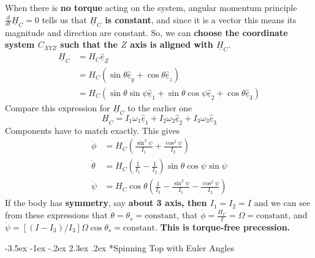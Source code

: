 \documentclass[letterpaper,twocolumn,notitlepage]{article}
\makeatletter
\renewcommand\subsection{\@startsection{section}{1}{\z@}%
 {-3.5ex \@plus-1ex \@minus-.2ex}%
 {2.3ex \@plus.2ex}%
 {\fontsize{8pt}{8pt}\selectfont\sffamily}}
\makeatother
\begin{document}
  When there is \textbf{no torque} acting on the system, angular momentum principle $\frac{d}{dt}\underline{H}_{C}=0$ tells us that \textbf{$\underline{H}_{C}$ is constant}, and since it is a vector this means its magnitude and direction are constant.
  So, we can \textbf{choose the coordinate system $C_{XYZ}$ such that the $Z$ axis is aligned with $\underline{H}_{C}$}.
  \begin{equation*}
    \begin{split}
      \underline{H}_{C}&=H_{C}\hat{\underline{e}}_{Z} \\
      &=H_{C}(\sin\theta\hat{\underline{e}}_{y}+\cos\theta\hat{\underline{e}}_{z}) \\
      &=H_{C}(\sin\theta\sin\psi\hat{\underline{e}}_{1}+\sin\theta\cos\psi\hat{\underline{e}}_{2}+\cos\theta\hat{\underline{e}}_{3})
    \end{split}
  \end{equation*}
  Compare this expression for $\underline{H}_{C}$ to the earlier one
  \begin{equation*}
    \underline{H}_{C}=I_{1}\omega_{1}\hat{\underline{e}}_{1}+I_{2}\omega_{2}\hat{\underline{e}}_{2}+I_{3}\omega_{3}\hat{\underline{e}}_{3}
  \end{equation*}
  Components have to match exactly.
  This gives
  \begin{equation*}
    \begin{split}
      \dot{\phi}&=H_{C}\left(\frac{\sin^{2}\psi}{I_{1}}+\frac{\cos^{2}\psi}{I_{2}}\right) \\
      \dot{\theta}&=H_{C}\left(\frac{1}{I_{1}}-\frac{1}{I_{2}}\right)\sin\theta\cos\psi\sin\psi \\
      \dot{\psi}&=H_{C}\cos\theta\left(\frac{1}{I_{3}}-\frac{\sin^{2}\psi}{I_{1}}-\frac{\cos^{2}\psi}{I_{2}}\right)
    \end{split}
  \end{equation*}
  If the body has \textbf{symmetry}, say \textbf{about 3 axis, then $I_{1}=I_{2}=I$} and we can see from these expressions that $\dot{\theta}=\theta_{s}=\text{constant}$, that $\dot{\phi}=\frac{H_{C}}{I}=\Omega=\text{constant}$, and $\dot{\psi}=[(I-I_{3})/I_{3}]\Omega\cos\theta_{s}=\text{constant}$.
  \textbf{This is torque-free precession.}

  \subsection*{Spinning Top with Euler Angles}
\end{document}
